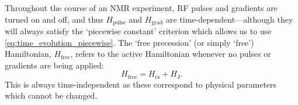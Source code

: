 Throughout the course of an NMR experiment, RF pulses and gradients are turned on and off, and thus $H_\text{pulse}$ and $H_\text{grad}$ are time-dependent---although they will always satisfy the `piecewise constant' criterion which allows us to use \cref{eq:time_evolution_piecewise}.
The `free precession' (or simply `free') Hamiltonian, $H_\text{free}$, refers to the active Hamiltonian whenever no pulses or gradients are being applied: 
\begin{equation}
    \label{eq:h_free}
    H_\text{free} = H_\text{cs} + H_\text{J}.
\end{equation}
This is always time-independent as these correspond to physical parameters which cannot be changed.
